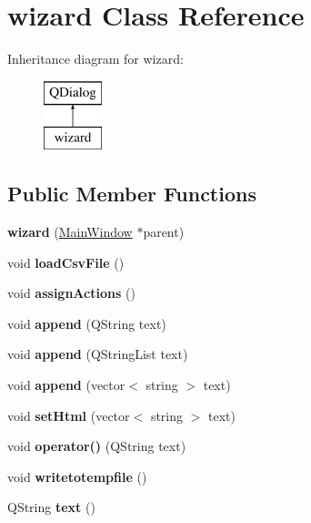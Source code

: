 \hypertarget{classwizard}{}\section{wizard Class Reference}
\label{classwizard}
Inheritance diagram for wizard\+:\begin{figure}[H]
\begin{center}
\leavevmode
\includegraphics[height=2.000000cm]{classwizard}
\end{center}
\end{figure}
\subsection*{Public Member Functions}
\begin{DoxyCompactItemize}
\item 
\mbox{\label{classwizard_a840e9bc32de9131a5fb0b1c9ba7db3a0}} 
{\bfseries wizard} (\hyperlink{class_main_window}{Main\+Window} $\ast$parent)
\item 
\mbox{\label{classwizard_a2bc40485d3a877fadfc46a0a24037935}} 
void {\bfseries load\+Csv\+File} ()
\item 
\mbox{\label{classwizard_a117875ea1a1ecb11327f0924a06cb3f1}} 
void {\bfseries assign\+Actions} ()
\item 
\mbox{\label{classwizard_adf929a75e9f11296fa6fd8902abbdb32}} 
void {\bfseries append} (Q\+String text)
\item 
\mbox{\label{classwizard_aab092076dcc3199228974de330f30498}} 
void {\bfseries append} (Q\+String\+List text)
\item 
\mbox{\label{classwizard_adedbd65aa2ad57a3278736403f3e7276}} 
void {\bfseries append} (vector$<$ string $>$ text)
\item 
\mbox{\label{classwizard_a96f2e57ac67d81b67131702037216102}} 
void {\bfseries set\+Html} (vector$<$ string $>$ text)
\item 
\mbox{\label{classwizard_a58d90ca02f67a4da121933b014d374cc}} 
void {\bfseries operator()} (Q\+String text)
\item 
\mbox{\label{classwizard_a05051c32d91ffa49add866235afeb02c}} 
void {\bfseries writetotempfile} ()
\item 
\mbox{\label{classwizard_a926101f7e0a83baaf925600cf299ebdd}} 
Q\+String {\bfseries text} ()
\end{DoxyCompactItemize}


